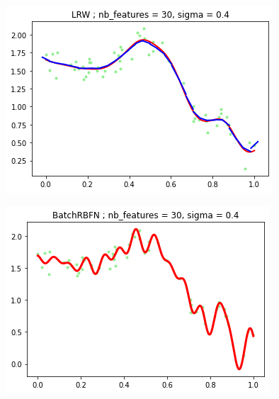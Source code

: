 \documentclass[french,12pt]{article}
\begin{document}
\begin{figure}[ht]
\begin{minipage}{.45\textwidth}
	\label{fig:lwr_vs_rbfn_error}
\end{minipage}
\begin{minipage}{.45\textwidth}
	\centering
	\includegraphics[width=\textwidth]{lwr_vs_rbfn_overfitting1.png}
	\label{fig:lwr_vs_rbfn_overfitting1}
\end{minipage}
\hfill
\begin{minipage}{.45\textwidth}
	\centering
	\includegraphics[width=\textwidth]{lwr_vs_rbfn_overfitting2.png}
	\label{fig:lwr_vs_rbfn_overfitting2}
\end{minipage}
\end{figure}
\end{document}
